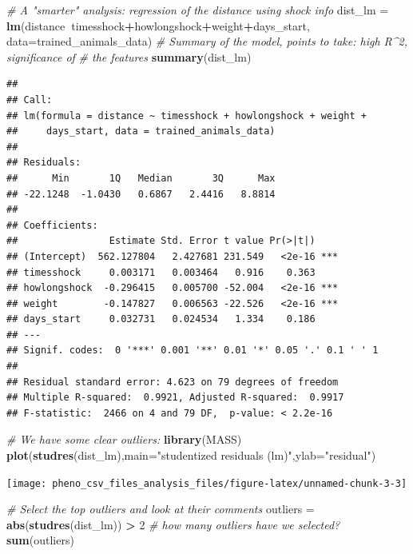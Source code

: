 \documentclass[]{article}
\newenvironment{Shaded}{\begin{snugshade}}{\end{snugshade}}
\newcommand{\KeywordTok}[1]{\textcolor[rgb]{0.13,0.29,0.53}{\textbf{#1}}}
\newcommand{\DataTypeTok}[1]{\textcolor[rgb]{0.13,0.29,0.53}{#1}}
\newcommand{\DecValTok}[1]{\textcolor[rgb]{0.00,0.00,0.81}{#1}}
\newcommand{\StringTok}[1]{\textcolor[rgb]{0.31,0.60,0.02}{#1}}
\newcommand{\CommentTok}[1]{\textcolor[rgb]{0.56,0.35,0.01}{\textit{#1}}}
\newcommand{\OperatorTok}[1]{\textcolor[rgb]{0.81,0.36,0.00}{\textbf{#1}}}
\newcommand{\NormalTok}[1]{#1}
\begin{document}
\begin{Shaded}
\begin{Highlighting}[]
\CommentTok{# A "smarter" analysis: regression of the distance using shock info}
\NormalTok{dist_lm  =}\StringTok{ }\KeywordTok{lm}\NormalTok{(distance}\OperatorTok{~}\NormalTok{timesshock}\OperatorTok{+}\NormalTok{howlongshock}\OperatorTok{+}\NormalTok{weight}\OperatorTok{+}\NormalTok{days_start,}
              \DataTypeTok{data=}\NormalTok{trained_animals_data)}
\CommentTok{# Summary of the model, points to take: high R^2, significance of}
\CommentTok{# the features}
\KeywordTok{summary}\NormalTok{(dist_lm)}
\end{Highlighting}
\end{Shaded}

\begin{verbatim}
## 
## Call:
## lm(formula = distance ~ timesshock + howlongshock + weight + 
##     days_start, data = trained_animals_data)
## 
## Residuals:
##      Min       1Q   Median       3Q      Max 
## -22.1248  -1.0430   0.6867   2.4416   8.8814 
## 
## Coefficients:
##                Estimate Std. Error t value Pr(>|t|)    
## (Intercept)  562.127804   2.427681 231.549   <2e-16 ***
## timesshock     0.003171   0.003464   0.916    0.363    
## howlongshock  -0.296415   0.005700 -52.004   <2e-16 ***
## weight        -0.147827   0.006563 -22.526   <2e-16 ***
## days_start     0.032731   0.024534   1.334    0.186    
## ---
## Signif. codes:  0 '***' 0.001 '**' 0.01 '*' 0.05 '.' 0.1 ' ' 1
## 
## Residual standard error: 4.623 on 79 degrees of freedom
## Multiple R-squared:  0.9921, Adjusted R-squared:  0.9917 
## F-statistic:  2466 on 4 and 79 DF,  p-value: < 2.2e-16
\end{verbatim}

\begin{Shaded}
\begin{Highlighting}[]
\CommentTok{# We have some clear outliers:}
\KeywordTok{library}\NormalTok{(MASS)}
\KeywordTok{plot}\NormalTok{(}\KeywordTok{studres}\NormalTok{(dist_lm),}\DataTypeTok{main=}\StringTok{"studentized residuals (lm)"}\NormalTok{,}\DataTypeTok{ylab=}\StringTok{"residual"}\NormalTok{)}
\end{Highlighting}
\end{Shaded}

\texttt{[image: pheno\_csv\_files\_analysis\_files/figure-latex/unnamed-chunk-3-3]}

\begin{Shaded}
\begin{Highlighting}[]
\CommentTok{# Select the top outliers and look at their comments}
\NormalTok{outliers =}\StringTok{ }\KeywordTok{abs}\NormalTok{(}\KeywordTok{studres}\NormalTok{(dist_lm)) }\OperatorTok{>}\StringTok{ }\DecValTok{2}
\CommentTok{# how many outliers have we selected?}
\KeywordTok{sum}\NormalTok{(outliers)}
\end{Highlighting}
\end{Shaded}
\end{document}
